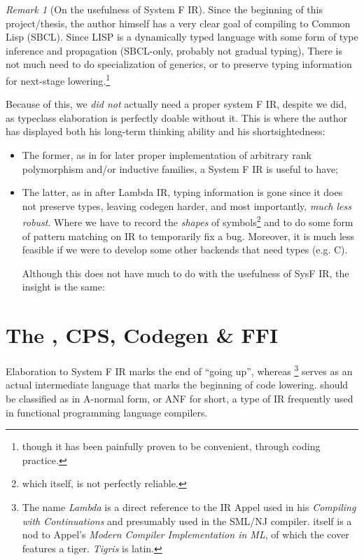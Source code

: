 \documentclass[a4paper, 11pt]{article}
\theoremstyle{remark}\newtheorem*{remark}{Remark}
\theoremstyle{definition}\newtheorem*{definition}{Definition}
\begin{document}
\begin{remark}[On the usefulness of System F IR]
Since the beginning of this project/thesis, the author himself has a very clear goal
of compiling \Tigris to Common Lisp (SBCL). Since LISP is a dynamically typed language
with some form of type inference and propagation (SBCL-only, probably not gradual typing),
There is not much need to do specialization of generics, or to preserve typing information for
next-stage lowering.\footnote{though it has been painfully proven to be convenient, through coding practice.}

Because of this, we \emph{did not} actually need a proper system F IR, despite we did, as
typeclass elaboration is perfectly doable without it. This is where the author has displayed both
his long-term thinking ability and his shortsightedness:
\begin{itemize}
  \item The former, as in for later proper implementation of arbitrary rank polymorphism and/or
    inductive families, a System F IR is useful to have;
  \item The latter, as in after Lambda IR, typing information is gone since it does not preserve
    types, leaving codegen harder, and most importantly, \emph{much less robust}. Where we have to
    record the \emph{shapes} of symbols\footnote{
      which itself, is not perfectly reliable.
    }
    and to do some form of pattern matching on IR to temporarily fix a bug.
    Moreover, it is much less feasible if we were to develop some other backends that need types (e.g. C).

    Although this does not have much to do with the usefulness of SysF IR, the insight is the same:
\end{itemize}

\end{remark}

\section{The \Lambdair, CPS, Codegen \& FFI}
Elaboration to System F IR marks the end of ``going up'', whereas \Lambdair\footnote{
The name \emph{Lambda} is a direct reference to the IR Appel used in his \emph{Compiling with Continuations}
and presumably used in the SML/NJ compiler. \Tigris itself is a nod to Appel's \emph{Modern Compiler Implementation in ML},
of which the cover features a tiger. \emph{Tigris} is latin.
}
serves as an actual
intermediate language that marks the beginning of code lowering. \Lambdair should be classified
as in A-normal form, or ANF for short, a type of IR frequently used in functional programming language
compilers.
\end{document}
